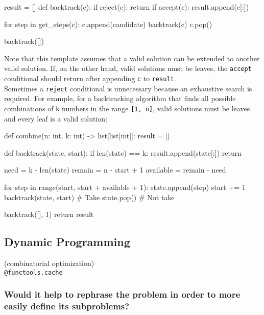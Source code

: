 \documentclass[12pt, titlepage]{article}
\begin{document}
\begin{python}
result = []
def backtrack(c):
    if reject(c):
        return
    if accept(c):
        result.append(c[:])

    for step in get_steps(c):
        c.append(candidate)
        backtrack(c)
        c.pop()

backtrack([])
\end{python} \medskip

Note that this template assumes that a valid solution can be extended to another valid solution. If, on the other hand, valid solutions must be leaves, the \texttt{accept} conditional should return after appending \texttt{c} to \texttt{result}. \\

Sometimes a \texttt{reject} conditional is unnecessary because an exhaustive search is required. For example, for a backtracking algorithm that finds all possible combinations of \texttt{k} numbers in the range \texttt{[1, n]}, valid solutions must be leaves and every leaf is a valid solution: \medskip

\begin{python}
def combine(n: int, k: int) -> list[list[int]]:
    result = []

    def backtrack(state, start):
        if len(state) == k:
            result.append(state[:])
            return
       
        need = k - len(state)
        remain = n - start + 1
        available = remain - need

        for step in range(start, start + available + 1):
            state.append(step)
            start += 1
            backtrack(state, start)  # Take
            state.pop()  # Not take

    backtrack([], 1)
    return result
\end{python}

\subsection{Dynamic Programming}

(combinatorial optimization) \\
\texttt{@functools.cache}

\subsubsection{Would it help to rephrase the problem in order to more easily define its subproblems?}
\end{document}
